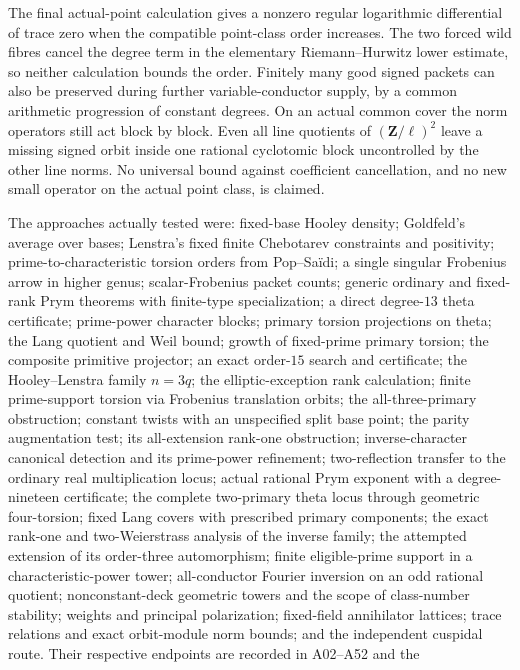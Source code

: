 The final actual-point calculation gives a nonzero regular logarithmic
differential of trace zero when the compatible point-class order increases.
The two forced wild fibres cancel the degree term in the elementary
Riemann--Hurwitz lower estimate, so neither calculation bounds the order.
Finitely many good signed packets can also be preserved during further
variable-conductor supply, by a common arithmetic progression of constant
degrees. On an actual common cover the norm operators still act block by
block. Even all line quotients of $(\mathbf Z/\ell)^2$ leave a missing
signed orbit inside one rational cyclotomic block uncontrolled by the other
line norms. No universal bound against coefficient cancellation, and no
new small operator on the actual point class, is claimed.

The approaches actually tested were: fixed-base Hooley density;
Goldfeld's average over bases; Lenstra's fixed finite Chebotarev
constraints and positivity; prime-to-characteristic torsion orders
from Pop--Sa\"idi; a single singular Frobenius arrow in higher genus;
scalar-Frobenius packet counts; generic ordinary and fixed-rank
Prym theorems with finite-type specialization; a direct degree-$13$
theta certificate; prime-power character blocks; primary torsion
projections on theta; the Lang quotient and Weil bound; growth of
fixed-prime primary torsion; the composite primitive projector;
an exact order-$15$ search and certificate; the Hooley--Lenstra
family $n=3q$; the elliptic-exception rank calculation; finite
prime-support torsion via Frobenius translation orbits; the
all-three-primary obstruction; constant twists with an unspecified
split base point; the parity augmentation test; its all-extension rank-one obstruction;
inverse-character canonical detection and its prime-power refinement;
two-reflection transfer to the ordinary real multiplication locus;
actual rational Prym exponent with a degree-nineteen certificate;
the complete two-primary theta locus through geometric four-torsion;
fixed Lang covers with prescribed primary components; the exact
rank-one and two-Weierstrass analysis of the inverse family;
the attempted extension of its order-three automorphism;
finite eligible-prime support in a characteristic-power tower;
all-conductor Fourier inversion on an odd rational quotient;
nonconstant-deck geometric towers and the scope of class-number stability;
weights and principal polarization; fixed-field annihilator lattices;
trace relations and exact orbit-module norm bounds;
and the independent cuspidal route.
Their respective endpoints are recorded in A02--A52 and the
